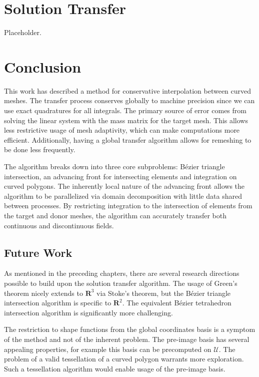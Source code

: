 \documentclass[letterpaper,10pt]{article}
\theoremstyle{definition}
\newcommand{\reals}{\mathbf{R}}
\newcommand{\utri}{\mathcal{U}}
\begin{document}
\section{Solution Transfer}\label{sec:solution-transfer}

Placeholder.

\section{Conclusion}

This work has described a method for conservative interpolation
between curved meshes. The transfer process conserves globally
to machine precision since we can use exact quadratures for all
integrals. The primary source of error comes from solving the linear
system with the mass matrix for the target mesh. This allows
less restrictive usage of mesh adaptivity, which can make computations
more efficient. Additionally, having a global transfer algorithm
allows for remeshing to be done less frequently.

The algorithm breaks down into three core subproblems: B\'{e}zier triangle
intersection, an advancing front for intersecting elements and
integration on curved polygons. The inherently local nature of the
advancing front allows the algorithm to be parallelized via domain
decomposition with little data shared between processes. By
restricting integration to the intersection of elements from the
target and donor meshes, the algorithm can accurately transfer
both continuous and discontinuous fields.

\subsection{Future Work}

As mentioned in the preceding chapters, there are several research
directions possible to build upon the solution transfer algorithm.
The usage of Green's theorem nicely extends to \(\reals^3\) via
Stoke's theorem, but the B\'{e}zier triangle intersection algorithm
is specific to \(\reals^2\). The equivalent B\'{e}zier tetrahedron
intersection algorithm is significantly more challenging.

The restriction to shape functions from the global coordinates basis
is a symptom of the method and not of the inherent problem. The
pre-image basis has several appealing properties, for example
this basis can be precomputed on \(\utri\). The problem of a
valid tessellation of a curved polygon warrants more exploration.
Such a tessellation algorithm would enable usage of the pre-image
basis.
\end{document}
